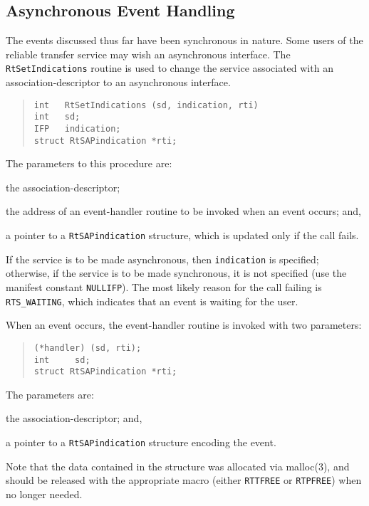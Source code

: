 \subsection     {Asynchronous Event Handling}
The events discussed thus far have been synchronous in nature.
Some users of the reliable transfer service may wish an asynchronous interface.
The \verb"RtSetIndications" routine is used to change the service associated
with an association-descriptor to an asynchronous interface.
\begin{quote}\small\begin{verbatim}
int   RtSetIndications (sd, indication, rti)
int   sd;
IFP   indication;
struct RtSAPindication *rti;
\end{verbatim}\end{quote}
The parameters to this procedure are:
\begin{describe}
\item[\verb"sd":] the association-descriptor;

\item[\verb"indication":] the address of an event-handler routine to be
invoked when an event occurs;
and,

\item[\verb"rti":] a pointer to a \verb"RtSAPindication" structure, which is
updated only if the call fails.
\end{describe}
If the service is to be made asynchronous,
then \verb"indication" is specified;
otherwise,
if the service is to be made synchronous,
it is not specified (use the manifest constant \verb"NULLIFP").
The most likely reason for the call failing is \verb"RTS_WAITING",
which indicates that an event is waiting for the user.

When an event occurs,
the event-handler routine is invoked with two parameters:
\begin{quote}\small\begin{verbatim}
(*handler) (sd, rti);
int     sd;
struct RtSAPindication *rti;
\end{verbatim}\end{quote}
The parameters are:
\begin{describe}
\item[\verb"sd":] the association-descriptor;
and,

\item[\verb"rti":] a pointer to a \verb"RtSAPindication" structure encoding
the event.
\end{describe}
Note that the data contained in the structure was allocated via \man malloc(3),
and should be released with the appropriate macro
(either \verb"RTTFREE" or \verb"RTPFREE")
when no longer needed.

